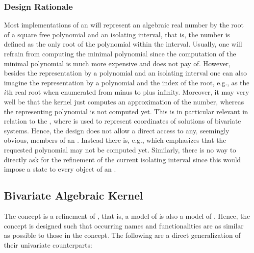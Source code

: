 \subsubsection{Design Rationale}

Most implementations of an  will represent
an algebraic real number by the root of a square free polynomial and
an isolating interval, that is, the number is defined as the only
root of the polynomial within the interval. Usually, one will refrain
from computing the minimal polynomial since the computation of the
minimal polynomial is much more expensive and does not pay of. However,
besides the representation by a polynomial and an isolating interval
one can also imagine the representation by a polynomial and the index
of the root, e.g., as the $i$th real root when enumerated from minus
to plus infinity. Moreover, it may very well be that the kernel just
computes an approximation of the number, whereas the representing
polynomial is not computed yet. 
This is in particular relevant in relation to the ,
where  is used to represent coordinates of solutions of bivariate systems.
Hence, the design does
not allow a direct access to any, seemingly obvious, members of an
. Instead there is, e.g.,
 which emphasizes
that the requested polynomial may not be computed yet. Similarly,
there is no way to directly ask for the refinement of the current
isolating interval since this would impose a state to every object of
an .


\subsection{Bivariate Algebraic Kernel}

The concept   is a refinement of , 
that is, a model of   is also a model of . 
Hence, the  concept is designed such that occurring 
names and functionalities are as similar as possible to those in the 
 concept.
The following are a direct generalization of their univariate counterparts: 

